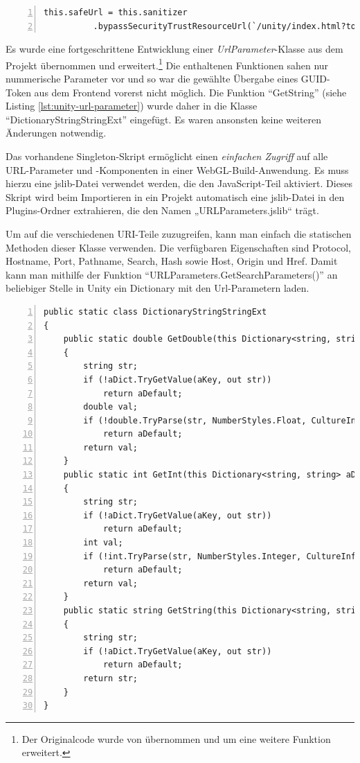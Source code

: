 \begin{lstlisting}[numbers=left,caption={IFrame for Unity in Frontend},label={lst:unity-url-parameter-in-action}]
this.safeUrl = this.sanitizer
          .bypassSecurityTrustResourceUrl(`/unity/index.html?token=${myToken}& server=${environment.apiConfig.uri}`);
\end{lstlisting}

Es wurde eine fortgeschrittene Entwicklung einer \emph{UrlParameter}-Klasse aus dem Projekt übernommen und erweitert.\footnote{Der Originalcode wurde von \cite{UrlParameter} übernommen und um eine weitere Funktion erweitert.} Die enthaltenen Funktionen sahen nur nummerische Parameter vor und so war die gewählte Übergabe eines GUID-Token aus dem Frontend vorerst nicht möglich. Die Funktion ``GetString'' (siehe Listing \ref{lst:unity-url-parameter}) wurde daher in die Klasse ``DictionaryStringStringExt'' eingefügt. Es waren ansonsten keine weiteren Änderungen notwendig.

Das vorhandene Singleton-Skript ermöglicht einen \emph{einfachen Zugriff} auf alle URL-Parameter und -Komponenten in einer WebGL-Build-Anwendung. Es muss hierzu eine jslib-Datei verwendet werden, die den JavaScript-Teil aktiviert. Dieses Skript wird beim Importieren in ein Projekt automatisch eine jslib-Datei in den Plugins-Ordner extrahieren, die den Namen „URLParameters.jslib“ trägt.

Um auf die verschiedenen URI-Teile zuzugreifen, kann man einfach die statischen Methoden dieser Klasse verwenden. Die verfügbaren Eigenschaften sind Protocol, Hostname, Port, Pathname, Search, Hash sowie Host, Origin und Href. Damit kann man mithilfe der Funktion ``URLParameters.GetSearchParameters()'' an beliebiger Stelle in Unity ein Dictionary mit den Url-Parametern laden.

\begin{lstlisting}[numbers=left,caption={UrlParameter},label={lst:unity-url-parameter}]
public static class DictionaryStringStringExt
{
    public static double GetDouble(this Dictionary<string, string> aDict, string aKey, double aDefault)
    {
        string str;
        if (!aDict.TryGetValue(aKey, out str))
            return aDefault;
        double val;
        if (!double.TryParse(str, NumberStyles.Float, CultureInfo.InvariantCulture, out val))
            return aDefault;
        return val;
    }
    public static int GetInt(this Dictionary<string, string> aDict, string aKey, int aDefault)
    {
        string str;
        if (!aDict.TryGetValue(aKey, out str))
            return aDefault;
        int val;
        if (!int.TryParse(str, NumberStyles.Integer, CultureInfo.InvariantCulture, out val))
            return aDefault;
        return val;
    }
    public static string GetString(this Dictionary<string, string> aDict, string aKey, string aDefault)
    {
        string str;
        if (!aDict.TryGetValue(aKey, out str))
            return aDefault;
        return str;
    }
}
\end{lstlisting}


